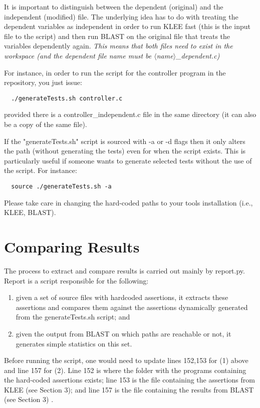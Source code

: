 \documentclass[a4paper, 11pt,twoside]{article}
\begin{document}
It is important to distinguish between the dependent (original) and the independent (modified) file. The underlying idea has to do with treating the dependent variables as independent in order to run KLEE fast (this is the input file to the script) and then run BLAST on the original file that treats the variables dependently again. \emph{This means that both files need to exist in the workspace (and the dependent file name must be $\langle$name$\rangle$\_dependent.c)}

For instance, in order to run the script for the controller program in the repository, you just issue:

\begin{verbatim} 
  ./generateTests.sh controller.c 	
\end{verbatim}

provided there is a controller\_independent.c file in the same directory (it can also be a copy of the same file).

If the "generateTests.sh" script is sourced with -a or -d flags then it only alters the path (without generating the tests) even for when the script exists. This is particularly useful if someone wants to generate selected tests without the use of the script. For instance:

\begin{verbatim} 
  source ./generateTests.sh -a
\end{verbatim}

Please take care in changing the hard-coded paths to your tools installation (i.e., KLEE, BLAST). 

\section{Comparing Results}

The process to extract and compare results is carried out mainly by report.py. Report is a script responsible for the following:
\begin{enumerate}
  \item  given a set of source files with hardcoded assertions, it extracts these assertions and
compares them against the assertions dynamically generated from the generateTests.sh script; and
  \item given the output from BLAST on which paths are reachable or not, it generates simple statistics on this set.
\end{enumerate}

Before running the script, one would need to update lines 152,153 for (1) above and line 157 for (2). Line 152 is where the folder with the programs containing the hard-coded assertions exists; line 153 is the file containing the assertions from KLEE (see Section 3); and line 157 is the file containing the results from BLAST (see Section 3) .
\end{document}
